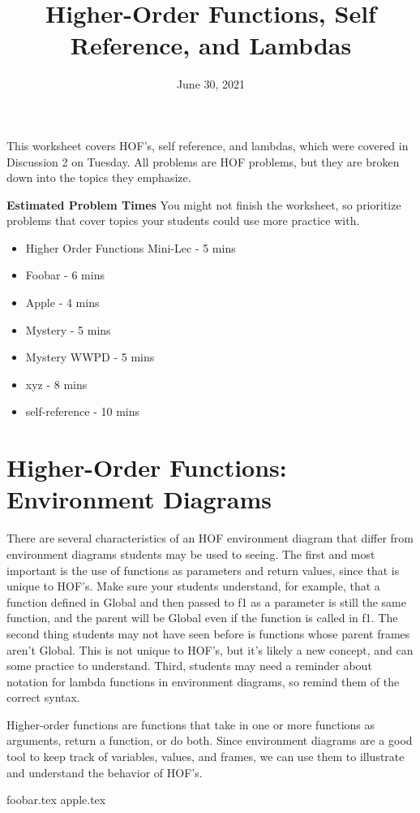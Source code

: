 \documentclass{exam}
\title{Higher-Order Functions, Self Reference, and Lambdas}
\date{June 30, 2021}
\begin{document}
\maketitle


\begin{blocksection}
\begin{guide}

This worksheet covers HOF's, self reference, and lambdas, which were covered in Discussion 2 on Tuesday. 
All problems are HOF problems, but they are broken down into the topics they emphasize.

\textbf{Estimated Problem Times}
\newline
You might not finish the worksheet, so prioritize problems that cover topics your students could use more practice with.
\begin{itemize}
    \item Higher Order Functions Mini-Lec - 5 mins
    \item Foobar - 6 mins
    \item Apple - 4 mins
    \item Mystery - 5 mins
    \item Mystery WWPD - 5 mins
    \item xyz - 8 mins
    \item self-reference - 10 mins
\end{itemize}
\end{guide}
\end{blocksection}


\section{Higher-Order Functions: Environment Diagrams}
\begin{guide}
There are several characteristics of an HOF environment diagram that differ from environment diagrams students may 
be used to seeing. The first and most important is the use of functions as parameters and return values, since 
that is unique to HOF's. Make sure your students understand, for example, that a function defined in Global and then 
passed to f1 as a parameter is still the same function, and the parent will be Global even if the function is called in 
f1. The second thing students may not have seen before is functions whose parent frames aren't Global. This is not unique to HOF's, 
but it's likely a new concept, and can some practice to understand. Third, students may need a reminder about notation for 
lambda functions in environment diagrams, so remind them of the correct syntax.
\newline
\end{guide}
Higher-order functions are functions that take in one or more functions as arguments, return a function, or do both. 
Since environment diagrams are a good tool to keep track of variables, values, and frames, we can use them to illustrate and 
understand the behavior of HOF's.
\begin{questions}
{foobar.tex}
{apple.tex}
\end{questions}
\end{document}

